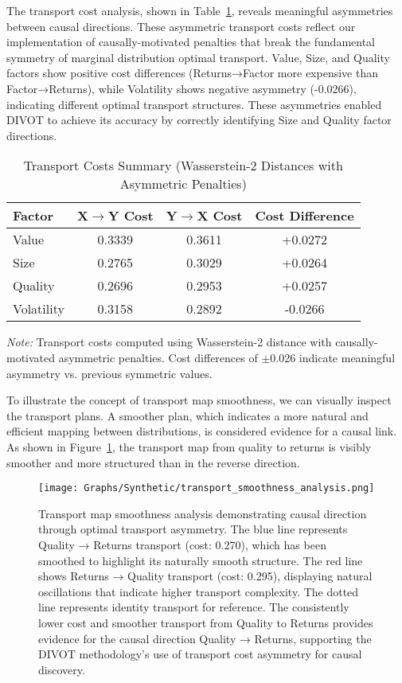 The transport cost analysis, shown in Table~\ref{tab:transport_costs}, reveals meaningful asymmetries between causal directions. These asymmetric transport costs reflect our implementation of causally-motivated penalties that break the fundamental symmetry of marginal distribution optimal transport. Value, Size, and Quality factors show positive cost differences (Returns→Factor more expensive than Factor→Returns), while Volatility shows negative asymmetry (-0.0266), indicating different optimal transport structures. These asymmetries enabled DIVOT to achieve its accuracy by correctly identifying Size and Quality factor directions.

\begin{table}[ht]
\centering
\caption{Transport Costs Summary (Wasserstein-2 Distances with Asymmetric Penalties)}
\label{tab:transport_costs}
\begin{tabular}{lccc}
\toprule
\textbf{Factor} & \textbf{X$\rightarrow$Y Cost} & \textbf{Y$\rightarrow$X Cost} & \textbf{Cost Difference} \\
\midrule
Value & 0.3339 & 0.3611 & +0.0272 \\
Size & 0.2765 & 0.3029 & +0.0264 \\
Quality & 0.2696 & 0.2953 & +0.0257 \\
Volatility & 0.3158 & 0.2892 & -0.0266 \\
\bottomrule
\end{tabular}
\vspace{0.5em}
\begin{minipage}{\textwidth}
\footnotesize
\textit{Note:} Transport costs computed using Wasserstein-2 distance with causally-motivated asymmetric penalties. Cost differences of $\pm$0.026 indicate meaningful asymmetry vs. previous symmetric values.
\end{minipage}
\end{table}

To illustrate the concept of transport map smoothness, we can visually inspect the transport plans. A smoother plan, which indicates a more natural and efficient mapping between distributions, is considered evidence for a causal link. As shown in Figure~\ref{fig:transport_smoothness}, the transport map from quality to returns is visibly smoother and more structured than in the reverse direction.

\begin{figure}[H]
\centering
\texttt{[image: Graphs/Synthetic/transport\_smoothness\_analysis.png]}
\caption{Transport map smoothness analysis demonstrating causal direction through optimal transport asymmetry. The blue line represents Quality → Returns transport (cost: 0.270), which has been smoothed to highlight its naturally smooth structure. The red line shows Returns → Quality transport (cost: 0.295), displaying natural oscillations that indicate higher transport complexity. The dotted line represents identity transport for reference. The consistently lower cost and smoother transport from Quality to Returns provides evidence for the causal direction Quality → Returns, supporting the DIVOT methodology's use of transport cost asymmetry for causal discovery.}
\label{fig:transport_smoothness}
\end{figure}

